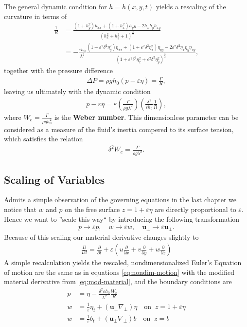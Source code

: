 The general dynamic condition for $h = h(x, y, t)$ yields a rescaling of the
curvature in terms of
\begin{align}
   \frac{1}{R}
   &= \frac{(1+h_y^2)h_{x x} + (1+h_x^2)h_yy - 2h_xh_yh_{xy}
   }{\left(h_x^2+h_y^2 +1  \right)^{\frac{3}{2}} } \\
   &= -\frac{\varepsilon h_0}{\lambda^2} \frac{(
   1+\varepsilon^2\delta^2\eta_y^2 )\eta_{x x}+
    (1+\varepsilon^2\delta^2\eta_x^2)\eta_{yy} -
    2\varepsilon^2\delta^2\eta_x\eta_y\eta_{xy}}{\left(
    1+\varepsilon^2\delta^2\eta_x^2+\varepsilon^2\delta^2\eta_y^2
    \right)^{\frac{3}{2}} },
\end{align}
together with the pressure difference
\begin{align}
    \Delta P = \rho g h_0(p - \varepsilon \eta) = \frac{\Gamma}{R},
\end{align}
leaving us ultimately with the dynamic condition
\begin{align}
    p-\varepsilon\eta= \varepsilon\left( \frac{\Gamma}{\rho g\lambda^2}
    \right) \left(\frac{\lambda^2}{\varepsilon h_0}\frac{1}{R}\right),
\end{align}
where $W_e = \frac{\Gamma}{\rho g h_0^2}$ is the \textbf{Weber number}. This
dimensionless parameter can be considered as a measure of the fluid's inertia
compered to its surface tension, which satisfies the relation
\begin{align}
    \delta^2 W_e = \frac{\Gamma}{\rho g \lambda^2}.
\end{align}
\subsection{Scaling of Variables}
Admits a simple observation of the governing equations in the last chapter we
notice that $w$ and $p$ on the free surface $z = 1 + \varepsilon\eta$ are
directly proportional to $\varepsilon$. Hence we want to ''scale this way``
by introducing the following transformation
\begin{align}
    p \rightarrow \varepsilon p, \quad w \rightarrow \varepsilon w, \quad
    \mathbf{u}_\perp \rightarrow \varepsilon \mathbf{u}_\perp.
\end{align}
Because of this scaling our material derivative changes slightly to
\begin{align}\label{eq:mod-material}
    \frac{D}{Dt} = \frac{\partial }{\partial t} + \varepsilon\left(u
    \frac{\partial }{\partial x}  + v \frac{\partial }{\partial y}  + w
    \frac{\partial }{\partial z} \right)
\end{align}
A simple recalculation yields the rescaled, nondimensionalized Euler's
Equation of motion are the same as in equations \ref{eq:nondim-motion} with
the modified material derivative from \ref{eq:mod-material}, and the boundary
conditions are
\begin{align}
    p &= \eta - \frac{\delta^2\varepsilon h_0}{\lambda^2} \frac{W_e}{R}\\
    w &= \frac{1}{\varepsilon}\eta_t + (\mathbf{u}_\perp \nabla_\perp)\eta
    \quad \text{on}\;\; z = 1+\varepsilon\eta\\
    w &=\frac{1}{\varepsilon}b_t + (\mathbf{u}_\perp \nabla_\perp)b \quad
    \text{on}\;\; z=b
\end{align}
